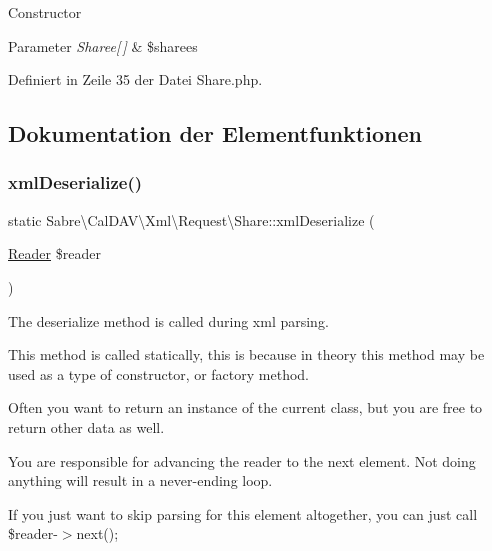 Constructor


\begin{DoxyParams}{Parameter}
{\em Sharee\mbox{[}$\,$\mbox{]}} & \$sharees \\
\hline
\end{DoxyParams}


Definiert in Zeile 35 der Datei Share.\+php.



\subsection{Dokumentation der Elementfunktionen}
\mbox{\label{class_sabre_1_1_cal_d_a_v_1_1_xml_1_1_request_1_1_share_af07214cfef61954a95debec967682d5b}} 
\subsubsection{\texorpdfstring{xml\+Deserialize()}{xmlDeserialize()}}
{\footnotesize\ttfamily static Sabre\textbackslash{}\+Cal\+D\+A\+V\textbackslash{}\+Xml\textbackslash{}\+Request\textbackslash{}\+Share\+::xml\+Deserialize (\begin{DoxyParamCaption}\item[{\mbox{\hyperlink{class_sabre_1_1_xml_1_1_reader}{Reader}}}]{\$reader }\end{DoxyParamCaption})\hspace{0.3cm}{\ttfamily [static]}}

The deserialize method is called during xml parsing.

This method is called statically, this is because in theory this method may be used as a type of constructor, or factory method.

Often you want to return an instance of the current class, but you are free to return other data as well.

You are responsible for advancing the reader to the next element. Not doing anything will result in a never-\/ending loop.

If you just want to skip parsing for this element altogether, you can just call \$reader-\/$>$next();

